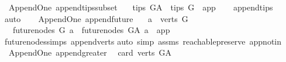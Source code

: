 \begin{isabellebody}
{\isafoldproof}%
%
\isadelimproof
\isanewline
%
\endisadelimproof
{}\isamarkupfalse%
\isanewline
\isanewline
{}\isamarkupfalse%
\ {\isacharparenleft}{\kern0pt}\ Append{\isacharunderscore}{\kern0pt}One{\isacharparenright}{\kern0pt}\ append{\isacharunderscore}{\kern0pt}tips{\isacharunderscore}{\kern0pt}subset{\isacharcolon}{\kern0pt}\isanewline
\ \ {\isachardoublequoteopen}\ tips\ G{\isacharunderscore}{\kern0pt}A\ {\isasymsubseteq}\ tips\ G\ {\isasymunion}\ {\isacharbraceleft}{\kern0pt}app{\isacharbraceright}{\kern0pt}{\isachardoublequoteclose}\isanewline
%
\isadelimproof
\ \ %
\endisadelimproof
%
\isatagproof
{}\isamarkupfalse%
\ append{\isacharunderscore}{\kern0pt}tips\isanewline
\ \ \isamarkupfalse%
\ auto%
\endisatagproof
{\isafoldproof}%
%
\isadelimproof
\ \isanewline
%
\endisadelimproof
\isanewline
\isanewline
{}\isamarkupfalse%
\ {\isacharparenleft}{\kern0pt}\ Append{\isacharunderscore}{\kern0pt}One{\isacharparenright}{\kern0pt}\ append{\isacharunderscore}{\kern0pt}future{\isacharcolon}{\kern0pt}\isanewline
\ \ \ {\isachardoublequoteopen}a\ {\isasymin}\ verts\ G{\isachardoublequoteclose}\isanewline
\ \ \ {\isachardoublequoteopen}future{\isacharunderscore}{\kern0pt}nodes\ G\ a\ {\isacharequal}{\kern0pt}\ future{\isacharunderscore}{\kern0pt}nodes\ G{\isacharunderscore}{\kern0pt}A\ a\ {\isacharminus}{\kern0pt}\ {\isacharbraceleft}{\kern0pt}app{\isacharbraceright}{\kern0pt}{\isachardoublequoteclose}\isanewline
%
\isadelimproof
\ \ %
\endisadelimproof
%
\isatagproof
{}\isamarkupfalse%
\ future{\isacharunderscore}{\kern0pt}nodes{\isachardot}{\kern0pt}simps\ append{\isacharunderscore}{\kern0pt}verts\isanewline
{}\isamarkupfalse%
{\isacharparenleft}{\kern0pt}auto\ simp{\isacharcolon}{\kern0pt}\ assms\ reachable{}{\isacharunderscore}{\kern0pt}preserve\ app{\isacharunderscore}{\kern0pt}notin{\isacharparenright}{\kern0pt}\ \isamarkupfalse%
%
\endisatagproof
{\isafoldproof}%
%
\isadelimproof
\isanewline
%
\endisadelimproof
\isanewline
{}\isamarkupfalse%
\ {\isacharparenleft}{\kern0pt}\ Append{\isacharunderscore}{\kern0pt}One{\isacharparenright}{\kern0pt}\ append{\isacharunderscore}{\kern0pt}greater{\isacharunderscore}{\kern0pt}{}{\isacharcolon}{\kern0pt}\isanewline
\ \ {\isachardoublequoteopen}card\ {\isacharparenleft}{\kern0pt}verts\ G{\isacharunderscore}{\kern0pt}A{\isacharparenright}{\kern0pt}\ {\isachargreater}{\kern0pt}\ {}{\isachardoublequoteclose}\isanewline

\end{isabellebody}
